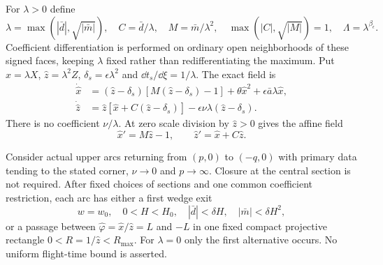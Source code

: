 For $\lambda>0$ define
\begin{equation}\label{rw:secondary:normalization}
 \lambda=\max(|\bar d|,\sqrt{|\bar m|}),\quad
 C=\bar d/\lambda,\quad M=\bar m/\lambda^2,\quad
 \max(|C|,\sqrt{|M|})=1,\quad
 \Lambda=\lambda^{\beta_\epsilon}.
\end{equation}
Coefficient differentiation is performed on ordinary open neighborhoods
of these signed faces, keeping $\lambda$ fixed rather than
redifferentiating the maximum.
Put $\hat x=\lambda X$, $\hat z=\lambda^2Z$,
$\delta_s=\epsilon\lambda^2$ and $\dd t_s/\dd\xi=1/\lambda$.
The exact field is
\begin{equation}\label{rw:secondary:field}
\begin{aligned}
 \dot{\hat x}&=(\hat z-\delta_s)[M(\hat z-\delta_s)-1]
                         +\theta\hat x^2+\epsilon\bar a\lambda\hat x,\\
 \dot{\hat z}&=\hat z[\hat x+C(\hat z-\delta_s)]
                         -\epsilon\nu\lambda(\hat z-\delta_s).
\end{aligned}
\end{equation}
There is no coefficient $\nu/\lambda$.
At zero scale division by $\hat z>0$ gives the affine field
\begin{equation}\label{rw:secondary:linear}
 \hat x'=M\hat z-1,\qquad \hat z'=\hat x+C\hat z.
\end{equation}

\begin{proposition}
\label{rw:secondary:routing}
Consider actual upper arcs returning from $(p,0)$ to $(-q,0)$
with primary data tending to the stated corner, $\nu\to0$ and
$p\to\infty$. Closure at the central section is not required.
After fixed choices of sections and one common coefficient restriction,
each arc has either a first wedge exit
\[
 w=w_0,\quad 0<H<H_0,\quad
 |\bar d|<\delta H,\quad |\bar m|<\delta H^2,
\]
or a passage between $\hat\varphi=\hat x/\hat z=L$ and $-L$
in one fixed compact projective rectangle
$0<R=1/\hat z<R_{\max}$.
For $\lambda=0$ only the first alternative occurs.
No uniform flight-time bound is asserted.
\end{proposition}

